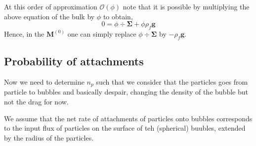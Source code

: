\documentclass[12pt]{My_preprint}
\begin{document}
At this order of approximation $\mathcal{O}(\phi)$ note that it is possible by multiplying the above equation of the bulk  by $\phi$ to obtain, 
\begin{equation}
    0
    = 
    \phi \div \bm\Sigma
    + \phi \rho_f \textbf{g}
\end{equation}
Hence, in the $\textbf{M}^{(0)}$ one can simply replace $\phi \div \bm\Sigma$ by $-\rho_f \textbf{g}$. 

\subsection{Probability of attachments }


Now we need to determine $n_p$ such that we consider that the particles goes from particle to bubbles and basically despair, changing the density of the bubble but not the drag for now. 


We assume that the net rate of attachments of particles onto bubbles corresponds to the input flux of particles on the surface of teh (spherical) buubles, extended by the radius of the particles. 
\end{document}
